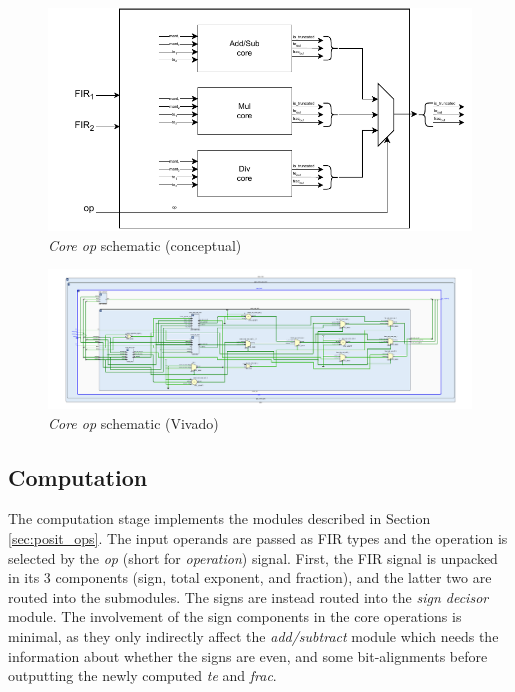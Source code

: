 \begin{figure}
    \centering
        \centering
        \includegraphics[width=\textwidth]{figures/core_op.drawio.pdf}
        \caption{\textit{Core op} schematic (conceptual)}
        \label{fig:core_op_ppu_schematic}
\end{figure}   


\begin{figure}
        \centering
        \includegraphics[width=\textwidth]{figures/core_op.vivado.pdf}
        \caption{\textit{Core op} schematic (Vivado)}
        \label{fig:core_op_ppu_schematic_vivado}
\end{figure}   




\subsection{Computation}


The computation stage implements the modules described in Section \ref{sec:posit_ops}.
The input operands are passed as FIR types and the operation is selected by the \textit{op} (short for \textit{operation}) signal.
First, the FIR signal is unpacked in its 3 components (sign, total exponent, and fraction), and the latter two are routed into the submodules. The signs are instead routed into the \textit{sign decisor} module. The involvement of the sign components in the core operations is minimal, as they only indirectly affect the \textit{add/subtract} module which needs the information about whether the signs are even, and some bit-alignments before outputting the newly computed \textit{te} and \textit{frac}.




